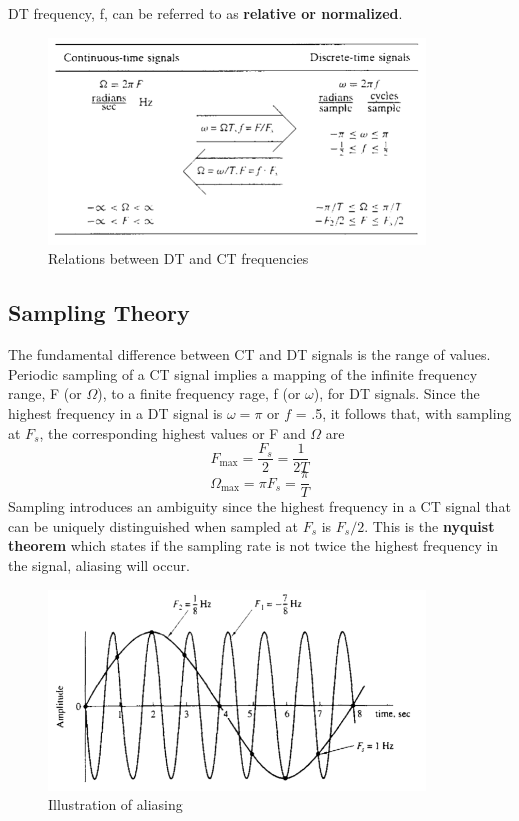 \documentclass{article} %
\begin{document}
    DT frequency, f, can be referred to as \textbf{relative or normalized}.
    \begin{figure}[h]
    \centering
	\includegraphics[width=10cm]{freqs}
	\caption{Relations between DT and CT frequencies}
	\end{figure}
	
	\subsection{Sampling Theory}
	The fundamental difference between CT and DT signals is the range of values. Periodic sampling of a CT signal implies a mapping of the infinite frequency range, F (or $\Omega$), to a finite frequency rage, f (or $\omega$), for DT signals. Since the highest frequency in a DT signal is $\omega = \pi$ or $f$ = .5, it follows that, with sampling at $F_s$, the corresponding highest values or F and $\Omega$ are
	\begin{equation}  
	F_{\mathrm{max}} = \frac{F_s}{2} = \frac{1}{2T}
    \end{equation}
    \begin{equation}  
	\Omega_{\mathrm{max}} = \pi F_s = \frac{\pi}{T}
    \end{equation}
    Sampling introduces an ambiguity since the highest frequency in a CT signal that can be uniquely distinguished when sampled at $F_s$ is $F_s/2$. This is the \textbf{nyquist theorem} which states if the sampling rate is not twice the highest frequency in the signal, aliasing will occur.
    \begin{figure}[h]
    \centering
	\includegraphics[width=10cm]{alias}
	\caption{Illustration of aliasing}
	\end{figure}
    
    
\end{document}
